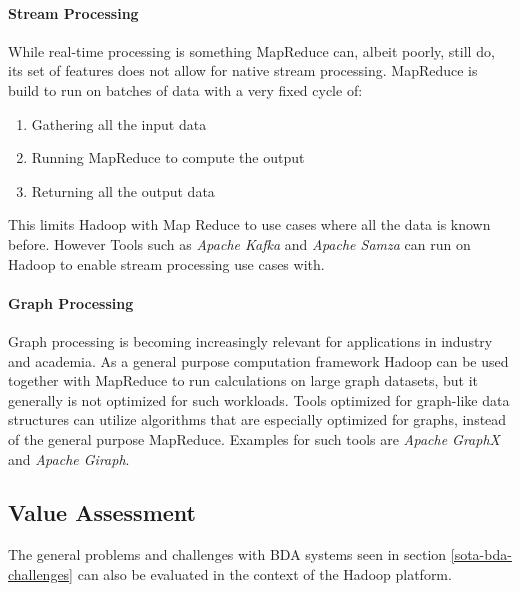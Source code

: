 \paragraph{Stream Processing}
While real-time processing is something MapReduce can, albeit poorly, still do, its set of features does not allow for native stream processing. MapReduce is build to run on batches of data with a very fixed cycle of:
\begin{enumerate}
    \item Gathering all the input data
    \item Running MapReduce to compute the output
    \item Returning all the output data
\end{enumerate}
This limits Hadoop with Map Reduce to use cases where all the data is known before.
However Tools such as \emph{Apache Kafka} and \emph{Apache Samza} can run on Hadoop to enable stream processing use cases with.

\paragraph{Graph Processing}
Graph processing is becoming increasingly relevant for
applications in industry and academia. 
As a general purpose computation framework Hadoop 
can be used together with MapReduce to run calculations 
on large graph datasets, 
but it generally is not optimized for such workloads.\autocite[][]{Capota:2015:GBD:2764947.2764954} 
Tools optimized for graph-like data structures can utilize algorithms that are especially optimized for graphs, instead of the general purpose MapReduce.
Examples for such tools are \emph{Apache GraphX} and \emph{Apache Giraph}.

\subsection{Value Assessment}
\label{hadoop-assessment}
The general problems and challenges with \ac{BDA} systems seen in section  \vref{sota-bda-challenges}
can also be evaluated in the context of the Hadoop platform.

